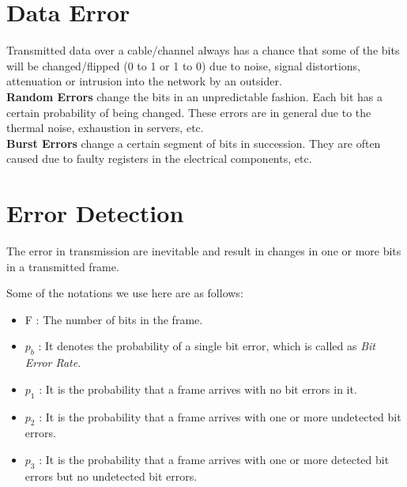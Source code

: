 \documentclass[12pt]{article}
\begin{document}
\maketitle


\section{Data Error}
    Transmitted data over a cable/channel always has a chance that some of the bits will be changed/flipped (0 to 1 or 1 to 0) due to noise, signal distortions, attenuation or intrusion into the network by an outsider. \\
    
    \textbf{Random Errors} change the bits in an unpredictable fashion. Each bit has a certain probability of being changed. These errors are in general due to the thermal noise, exhaustion in servers, etc. \\
    
    \textbf{Burst Errors} change a certain segment of bits in succession. They are often caused due to faulty registers in the electrical components, etc.


\section{Error Detection}
The error in transmission are inevitable and result in changes in one or more bits in a transmitted frame.

Some of the notations we use here are as follows:
\begin{itemize}
    \item F : The number of bits in the frame.
    \item {$p_b$} : It denotes the probability of a single bit error, which is called as \textit{Bit Error Rate}.
    \item {$p_1$} : It is the probability that a frame arrives with no bit errors in it.
    \item {$p_2$} : It is the probability that a frame arrives with one or more undetected bit errors.
    \item {$p_3$} : It is the probability that a frame arrives with one or more detected bit errors but no undetected bit errors.
\end{itemize}
    
\end{document}
